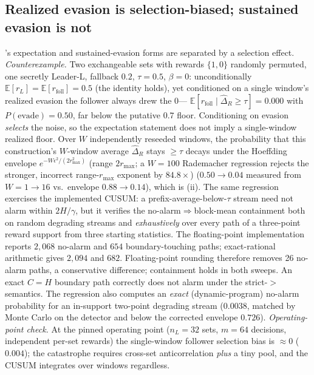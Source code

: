 \documentclass{article}
\newcommand{\dhat}{\hat{\Delta}}
\newcommand{\rmax}{r_{\max}}
\begin{document}
\subsection{Realized evasion is selection-biased; sustained evasion is not}\label{sec:eval-prop1}
's expectation and sustained-evasion forms are separated by a
selection effect. \emph{Counterexample.} Two exchangeable sets
with rewards $\{1,0\}$ randomly permuted, one secretly Leader-L, fallback $0.2$, $\tau{=}0.5$,
$\beta{=}0$: unconditionally $\mathbb{E}[r_L]{=}\mathbb{E}[r_{\text{foll}}]{=}0.5$ (the identity
holds), yet conditioned on a single window's realized evasion the follower always drew the $0$---
$\mathbb{E}[r_{\text{foll}}\mid\dhat_R\ge\tau]{=}0.000$ with $P(\text{evade}){=}0.50$, far below
the putative $0.7$ floor. Conditioning on evasion \emph{selects} the noise, so
the expectation statement does not imply a single-window realized floor. Over
$W$ independently reseeded windows, the probability that this construction's $W$-window average
$\dhat_R$ stays $\ge\tau$ decays under the Hoeffding envelope $e^{-W\epsilon^2/(2r_{\max}^2)}$
(range $2\rmax$; a $W{=}100$ Rademacher regression rejects the stronger,
incorrect range-$\rmax$ exponent by $84.8\times$)
($0.50\!\to\!0.04$ measured from $W{=}1\!\to\!16$ vs.\ envelope $0.88\!\to\!0.14$), which is
(ii). The same regression exercises the implemented CUSUM:
a prefix-average-below-$\tau$ stream need not alarm within $2H/\gamma$, but it verifies the
no-alarm$\Rightarrow$block-mean containment both on random degrading streams and
\emph{exhaustively} over every path of a three-point reward support from three starting
statistics. The floating-point implementation reports $2{,}068$ no-alarm and $654$
boundary-touching paths; exact-rational arithmetic gives $2{,}094$ and $682$.
Floating-point rounding therefore removes 26 no-alarm paths, a conservative
difference; containment holds in both sweeps. An exact $C{=}H$ boundary path
correctly does not alarm under the strict-$>$ semantics. The regression also computes an \emph{exact}
(dynamic-program) no-alarm probability for an in-support two-point degrading stream
($0.0038$, matched by Monte Carlo on the detector and below the corrected envelope $0.726$).
\emph{Operating-point check.} At the pinned operating
point ($n_L{=}32$ sets, $m{=}64$ decisions, independent per-set rewards) the single-window
follower selection bias is $\approx\!0$ ($0.004$); the catastrophe requires cross-set
anticorrelation \emph{plus} a tiny pool, and the CUSUM integrates over windows regardless.
\end{document}
